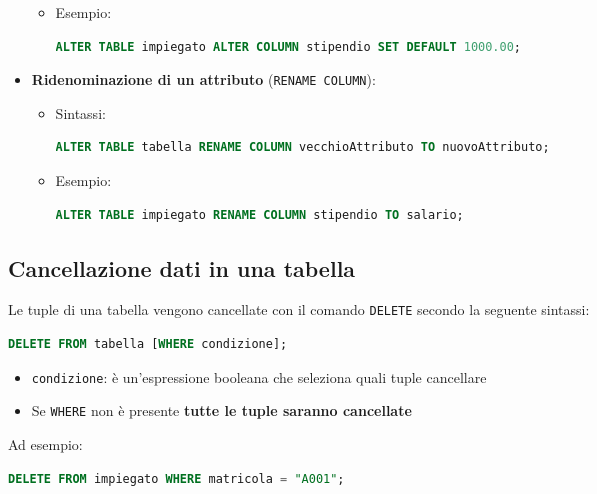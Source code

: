\documentclass[a4paper]{article}
\begin{document}
\begin{itemize}
\begin{itemize}
      \item Esempio:
\begin{lstlisting}[language=SQL, numbers=none]
ALTER TABLE impiegato ALTER COLUMN stipendio SET DEFAULT 1000.00;
\end{lstlisting}
    \end{itemize}

  \item \textbf{Ridenominazione di un attributo} (\texttt{RENAME COLUMN}):
    \begin{itemize}
      \item Sintassi:
\begin{lstlisting}[language=SQL, numbers=none]
ALTER TABLE tabella RENAME COLUMN vecchioAttributo TO nuovoAttributo;
\end{lstlisting}
      \item Esempio:
\begin{lstlisting}[language=SQL, numbers=none]
ALTER TABLE impiegato RENAME COLUMN stipendio TO salario;
\end{lstlisting}
    \end{itemize}
\end{itemize}

\subsection{Cancellazione dati in una tabella}
Le tuple di una tabella vengono cancellate con il comando \texttt{DELETE} secondo
la seguente sintassi:
\begin{lstlisting}[language=SQL, numbers=none]
DELETE FROM tabella [WHERE condizione];
\end{lstlisting}
\begin{itemize}
  \item \texttt{condizione}: è un'espressione booleana che seleziona quali tuple
    cancellare

  \item Se \texttt{WHERE} non è presente \textbf{tutte le tuple saranno cancellate}
\end{itemize}
Ad esempio:
\begin{lstlisting}[language=SQL, numbers=none]
DELETE FROM impiegato WHERE matricola = "A001";
\end{lstlisting}
\end{document}
